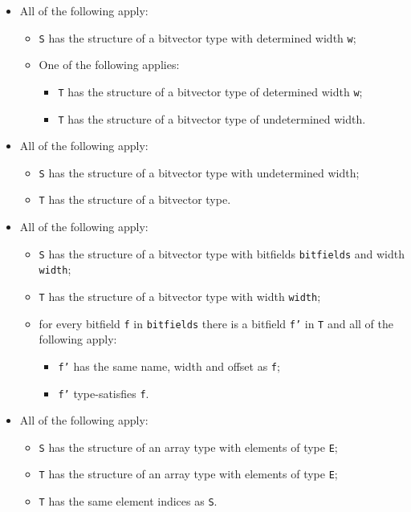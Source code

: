 \documentclass{book}
\begin{document}
\begin{itemize}
  \item All of the following apply:
    \begin{itemize}
    \item \texttt{S} has the structure of a bitvector type with determined width \texttt{w};
    \item One of the following applies:
      \begin{itemize}
      \item \texttt{T} has the structure of a bitvector type of determined width \texttt{w};
      \item \texttt{T} has the structure of a bitvector type of undetermined width.
      \end{itemize}
    \end{itemize}

  \item All of the following apply:
    \begin{itemize}
    \item \texttt{S} has the structure of a bitvector type with undetermined width;
    \item \texttt{T} has the structure of a bitvector type. 
    \end{itemize}

  \item All of the following apply:
    \begin{itemize}
    \item \texttt{S} has the structure of a bitvector type with bitfields \texttt{bitfields} and width \texttt{width};
    \item \texttt{T} has the structure of a bitvector type with width \texttt{width};
    \item for every bitfield \texttt{f} in \texttt{bitfields} there is a bitfield \texttt{f'} in \texttt{T} and
      all of the following apply:
      \begin{itemize}
      \item \texttt{f'} has the same name, width and offset as \texttt{f};
      \item \texttt{f'} type-satisfies \texttt{f}.
      \end{itemize}
    \end{itemize}

  \item All of the following apply:
    \begin{itemize}
    \item \texttt{S} has the structure of an array type with elements of type \texttt{E};
    \item \texttt{T} has the structure of an array type with elements of type \texttt{E};
    \item \texttt{T} has the same element indices as \texttt{S}.
    \end{itemize}


\end{itemize}
\end{document}
